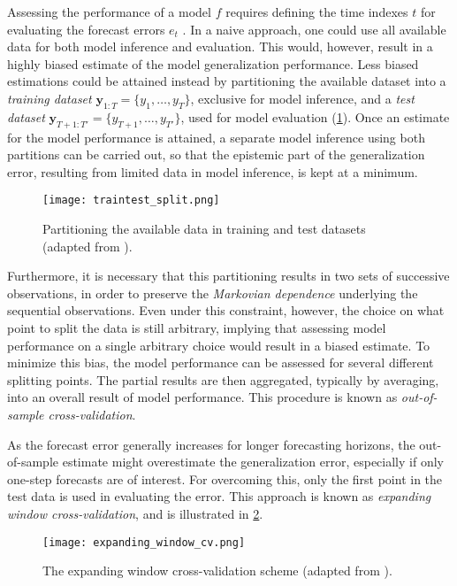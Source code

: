 Assessing the performance of a model $f$ requires defining the time indexes $t$ for evaluating the forecast errors $e_{t}$ . In a naive approach, one could use all available data for both model inference and evaluation. This would, however, result in a highly biased estimate of the model generalization performance. Less biased estimations could be attained instead by partitioning the available dataset into a \textit{training dataset} $\boldsymbol{y} _{1:T} = \{y_1,…,y_T\}$, exclusive for model inference, and a \textit{test dataset} $\boldsymbol{y} _{T+1:T'} = \{y_{T+1},…,y_{T'}\}$, used for model evaluation (\ref{fig:training_test_split}). Once an estimate for the model performance is attained, a separate model inference using both partitions can be carried out, so that the epistemic part of the generalization error, resulting from limited data in model inference, is kept at a minimum.
\begin{figure}[H]%
	\centering
    \caption{Partitioning the available data in training and test datasets (adapted from \cite{krispin2019handson}).}
    \texttt{[image: traintest\_split.png]}
	\label{fig:training_test_split}
\end{figure}

Furthermore, it is necessary that this partitioning results in two sets of successive observations, in order to preserve the \textit{Markovian dependence} underlying the sequential observations. Even under this constraint, however, the choice on what point to split the data is still arbitrary, implying that assessing model performance on a single arbitrary choice would result in a biased estimate. To minimize this bias, the model performance can be assessed for several different splitting points. The partial results are then aggregated, typically by averaging, into an overall result of model performance. This procedure is known as \textit{out-of-sample cross-validation}.

As the forecast error generally increases for longer forecasting horizons, the out-of-sample estimate might overestimate the generalization error, especially if only one-step forecasts are of interest. For overcoming this, only the  first point in the test data is used in evaluating the error. This approach is known as \textit{expanding window cross-validation}, and is illustrated in \ref{fig:expanding_window_cv}.
\begin{figure}[H]%
	\centering
    \caption{The expanding window cross-validation scheme (adapted from \cite{krispin2019handson}).}
    \texttt{[image: expanding\_window\_cv.png]}
	\label{fig:expanding_window_cv}
\end{figure}


